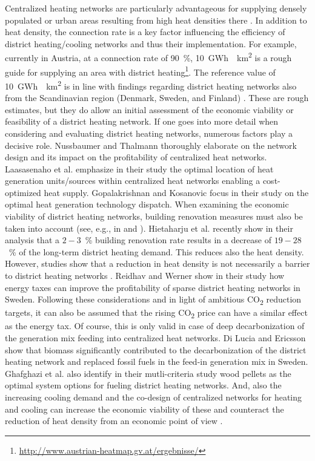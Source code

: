 Centralized heating networks are particularly advantageous for supplying densely populated or urban areas resulting from high heat densities there \cite{inage2020development}. In addition to heat density, the connection rate is a key factor influencing the efficiency of district heating/cooling networks and thus their implementation. For example, currently in Austria, at a connection rate of \SI{90}{\%}, \SI{10}{GWh \per km^2} is a rough guide for supplying an area with district heating\footnote{\url{http://www.austrian-heatmap.gv.at/ergebnisse/}}. The reference value of \SI{10}{GWh \per km^2} is in line with findings regarding district heating networks also from the Scandinavian region (Denmark, Sweden, and Finland) \cite{zinko2008district}. These are rough estimates, but they do allow an initial assessment of the economic viability or feasibility of a district heating network. If one goes into more detail when considering and evaluating district heating networks, numerous factors play a decisive role. Nussbaumer and Thalmann \cite{nussbaumer2016influence} thoroughly elaborate on the network design and its impact on the profitability of centralized heat networks. Laasasenaho et al. \cite{laasasenaho2019gis} emphasize in their study the optimal location of heat generation units/sources within centralized heat networks enabling a cost-optimized heat supply. Gopalakrishnan and Kosanovic \cite{gopalakrishnan2014economic} focus in their study on the optimal heat generation technology dispatch. When examining the economic viability of district heating networks, building renovation measures must also be taken into account (see, e.g., in \cite{andric2018impact} and \cite{rabani2021achieving}). Hietaharju et al. \cite{hietaharju2021stochastic} recently show in their analysis that a $2-3$\SI{}{\%} building renovation rate results in a decrease of $19-28$\SI{}{\%} of the long-term district heating demand. This reduces also the heat density. However, studies show that a reduction in heat density is not necessarily a barrier to district heating networks \cite{persson2011heat}. Reidhav and Werner \cite{reidhav2008profitability} show in their study how energy taxes can improve the profitability of sparse district heating networks in Sweden. Following these considerations and in light of ambitious CO\textsubscript{2} reduction targets, it can also be assumed that the rising CO\textsubscript{2} price can have a similar effect as the energy tax. Of course, this is only valid in case of deep decarbonization of the generation mix feeding into centralized heat networks. Di Lucia and Ericsson \cite{di2014low} show that biomass significantly contributed to the decarbonization of the district heating network and replaced fossil fuels in the feed-in generation mix in Sweden. Ghafghazi et al. \cite{ghafghazi2010multicriteria} also identify in their mutli-criteria study wood pellets as the optimal system options for fueling district heating networks. And, also the increasing cooling demand and the co-design of centralized networks for heating and cooling can increase the economic viability of these and counteract the reduction of heat density from an economic point of view \cite{zhang2021economic}.


